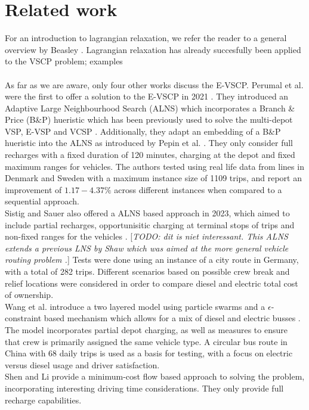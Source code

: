 \documentclass[]{article}
\newcommand{\todo}[1]{{\color{red}[\textit{TODO: #1}]}}
\begin{document}
\section{Related work}
For an introduction to lagrangian relaxation, we refer the reader to a general overview by Beasley \cite{Beasley1993}. Lagrangian relaxation has already succesfully been applied to the VSCP problem; examples  \\\\
As far as we are aware, only four other works discuss the E-VSCP. Perumal et al. were the first to offer a solution to the E-VSCP in 2021 \cite{PERUMAL2021105268}. They introduced an Adaptive Large Neighbourhood Search (ALNS) which incorporates a Branch \& Price (B\&P) hueristic which has been previously used to solve the multi-depot VSP, E-VSP and VCSP \cite{Pepin2009, Haase1996, vanKootenNiekerk2017}. Additionally, they adapt an embedding of a B\&P hueristic into the ALNS as introduced by Pepin et al. \cite{Pepin2009}. They only consider full recharges with a fixed duration of 120 minutes, charging at the depot and fixed maximum ranges for vehicles. The authors tested using real life data from lines in Denmark and Sweden with a maximum instance size of 1109 trips, and report an improvement of $1.17-4.37\%$ across different instances when compared to a sequential approach. \\
Sistig and Sauer also offered a ALNS based approach in 2023, which aimed to include partial recharges, opportunisitic charging at terminal stops of trips and non-fixed ranges for the vehicles \cite{SISTIG2023120915}. \todo{dit is niet interessant. This ALNS extends a previous LNS by Shaw which was aimed at the more general vehicle routing problem \cite{Shaw1997ANL, Shaw1998ANL}.} Tests were done using an instance of a city route in Germany, with a total of 282 trips. Different scenarios based on possible crew break and relief locations were considered in order to compare diesel and electric total cost of ownership. \\
Wang et al. introduce a two layered model using particle swarms and a $\epsilon$-constraint based mechanism which allows for a mix of diesel and electric busses \cite{su14063627}. The model incorporates partial depot charging, as well as measures to ensure that crew is primarily assigned the same vehicle type. A circular bus route in China with 68 daily trips is used as a basis for testing, with a focus on electric versus diesel usage and driver satisfaction. \\
Shen and Li provide a minimum-cost flow based approach to solving the problem, incorporating interesting driving time considerations. They only provide full recharge capabilities. \cite{SHEN2023}
\end{document}
